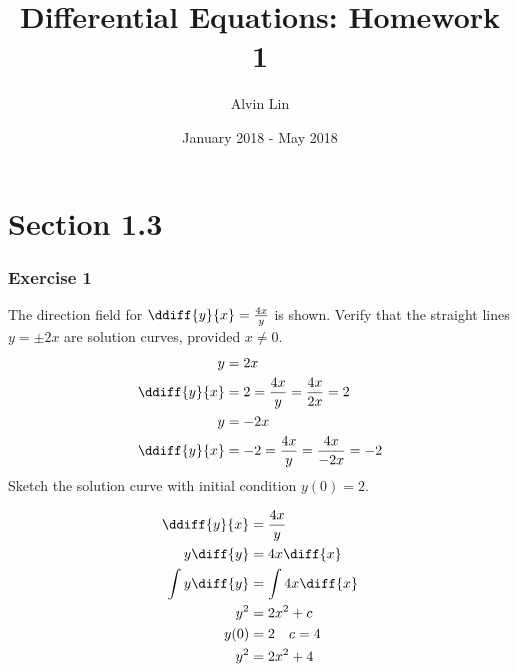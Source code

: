 \documentclass{math}
\title{Differential Equations: Homework 1}
\author{Alvin Lin}
\date{January 2018 - May 2018}
\begin{document}
\maketitle

\section*{Section 1.3}

\subsubsection*{Exercise 1}
The direction field for \( \ddiff{y}{x} = \frac{4x}{y} \) is shown.
Verify that the straight lines \( y = \pm2x \) are solution curves, provided
\( x \ne 0 \).
\begin{align*}
  y &= 2x \\
  \ddiff{y}{x} &= 2 = \frac{4x}{y} = \frac{4x}{2x} = 2 \\
  y &= -2x \\
  \ddiff{y}{x} &= -2 = \frac{4x}{y} = \frac{4x}{-2x} = -2
\end{align*}
Sketch the solution curve with initial condition \( y(0) = 2 \). \\[1cm]
\begin{minipage}[class]{7cm}
  \begin{align*}
    \ddiff{y}{x} &= \frac{4x}{y} \\
    y\diff{y} &= 4x\diff{x} \\
    \int y\diff{y} &= \int 4x\diff{x} \\
    y^2 &= 2x^2+c \\
    y(0) &= 2 \quad c = 4 \\
    y^2 &= 2x^2+4
  \end{align*}
\end{minipage}
\begin{minipage}[c]{8cm}
\end{minipage}
\clearpage
\end{document}

